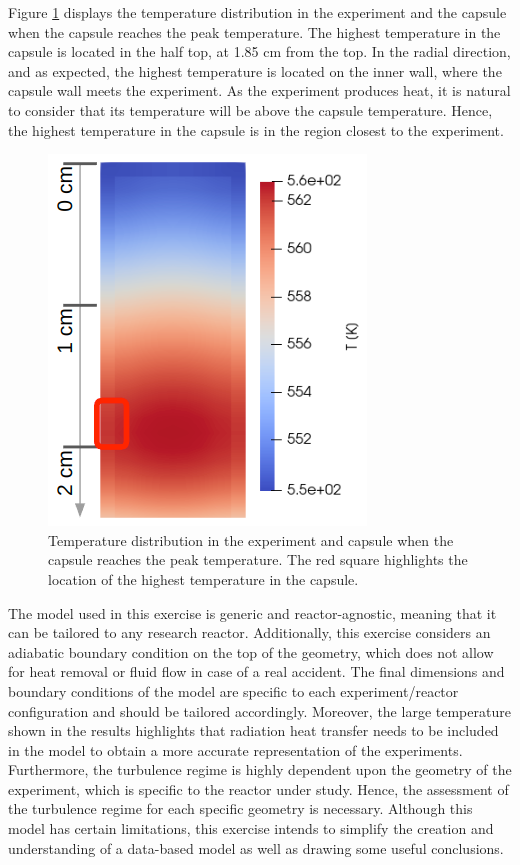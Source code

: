 Figure \ref{fig:tf-tfin} displays the temperature distribution in the experiment and the capsule when the capsule reaches the peak temperature.
The highest temperature in the capsule is located in the half top, at 1.85 cm from the top.
In the radial direction, and as expected, the highest temperature is located on the inner wall, where the capsule wall meets the experiment.
As the experiment produces heat, it is natural to consider that its temperature will be above the capsule temperature.
Hence, the highest temperature in the capsule is in the region closest to the experiment.

\begin{figure}[htbp!] %
    \centering
    \includegraphics[width=0.27\linewidth]{figures/T_tmax}
    \hfill
    \caption{Temperature distribution in the experiment and capsule when the capsule reaches the peak temperature. The red square highlights the location of the highest temperature in the capsule.}
    \label{fig:tf-tfin}
\end{figure}

The model used in this exercise is generic and reactor-agnostic, meaning that it can be tailored to any research reactor.
Additionally, this exercise considers an adiabatic boundary condition on the top of the geometry, which does not allow for heat removal or fluid flow in case of a real accident.
The final dimensions and boundary conditions of the model are specific to each experiment/reactor configuration and should be tailored accordingly.
Moreover, the large temperature shown in the results highlights that radiation heat transfer needs to be included in the model to obtain a more accurate representation of the experiments.
Furthermore, the turbulence regime is highly dependent upon the geometry of the experiment, which is specific to the reactor under study.
Hence, the assessment of the turbulence regime for each specific geometry is necessary.
Although this model has certain limitations, this exercise intends to simplify the creation and understanding of a data-based model as well as drawing some useful conclusions.


